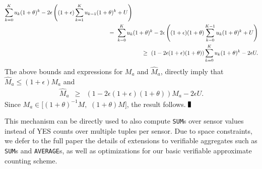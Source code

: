\documentclass[10pt,twocolumn]{article}
\newcommand{\csbbox}{\vrule height7pt width4pt depth1pt}
\begin{document}
{\begin{eqnarray*}
	\sum_{k=0}^K u_k (1+\theta)^k - 
	2\epsilon\left((1+\epsilon)\sum_{k=1}^K u_{k-1} (1+\theta)^k + U\right)\\
	&&\hspace*{-5em}=\ \sum_{k=0}^K u_k (1+\theta)^k - 
        2\epsilon\left( (1+\epsilon)(1+\theta)\sum_{k=0}^{K-1} u_{k} (1+\theta)^k 
        + U\right)\\
	&&\hspace*{-5em}\geq\ \left(1 - 2\epsilon(1+\epsilon)(1+\theta)\right) \sum_{k=0}^K u_k (1+\theta)^k 
        - 2\epsilon U.
      \end{eqnarray*}
      The above bounds and expressions for $M_a$ and $\hat{M}_a$, directly imply
      that 
      $\hat{M}_a\leq (1+\epsilon) M_a$ and
      \begin{eqnarray*}
	\hat{M}_a &\geq& (1 - 2\epsilon(1+\epsilon)(1+\theta)) M_a  - 2\epsilon U.
      \end{eqnarray*}
      Since $M_a\in [(1+\theta)^{-1} M,$ $(1+\theta)M]$, the result follows.
      \hfill$\csbbox$


}{}

\vspace*{-2em}
This mechanism can be directly used to also compute {\tt SUM}s over sensor
values instead of YES counts over multiple tuples per sensor. Due to space
constraints, we defer to the full paper the details of extensions
to verifiable aggregates such as {\tt SUM}s
and {\tt AVERAGE}s, as well as 
optimizations
for our basic verifiable approximate counting scheme.
\end{document}
